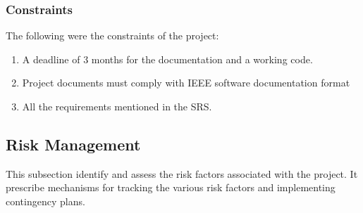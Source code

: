 \documentclass[12pt]{article}
\begin{document}
\subsubsection{Constraints}
The following were the constraints of the project:
\begin{enumerate}
  \item A deadline of 3 months for the documentation and a working code.
  \item Project documents must comply with IEEE  software documentation format
  \item All the requirements mentioned in the SRS.
\end{enumerate}

\subsection{Risk Management}
This subsection identify and assess the risk factors associated with the project. It prescribe mechanisms for tracking the various risk factors and implementing contingency plans.
\end{document}
